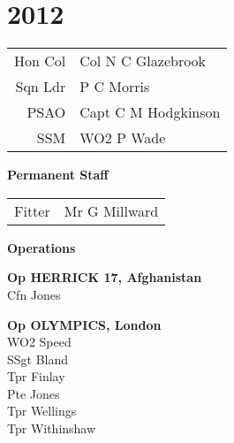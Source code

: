 \chapter*{2012}

\vspace*{20mm}

\begin{center}
  \begin{tabular}{rl}
    Hon Col & Col N C Glazebrook \\
    Sqn Ldr & P C Morris \\
    PSAO & Capt C M Hodgkinson \\
    SSM & WO2 P Wade \\
  \end{tabular}
\end{center}

\begin{center}
  \Large
  \textbf{Permanent Staff}
\end{center}

\begin{center}
  \begin{tabular}{rl}
    Fitter & Mr G Millward \\
  \end{tabular}
\end{center}

\vspace*{20mm}

\begin{center}
  \Large
  \textbf{Operations}
\end{center}

\begin{multicols}{2}
  \noindent
  \textbf{Op HERRICK 17, Afghanistan} \\
  Cfn Jones \\

  \columnbreak
  
  \noindent
  \textbf{Op OLYMPICS, London} \\
  WO2 Speed \\
  SSgt Bland \\
  Tpr Finlay \\
  Pte Jones \\
  Tpr Wellings \\
  Tpr Withinshaw \\
\end{multicols}
